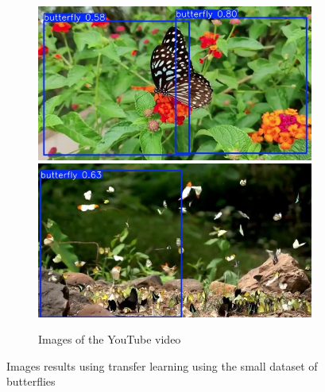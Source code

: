 \documentclass{cpsc202}
\begin{document}
\begin{figure}
        \begin{subfigure}{.9\textwidth}
            \centering
            \includegraphics[width=.4\linewidth]{trained_small_butterflies/photogram_16}
            \includegraphics[width=.4\linewidth]{trained_small_butterflies/photogram_93}
            \caption{Images of the YouTube video}
            \label{fig:video-trained_small_butterflies}
        \end{subfigure}
        \caption{Images results using transfer learning using the small dataset of butterflies}
        \label{fig:trained_small_butterflies}
    \end{figure}
\end{document}
